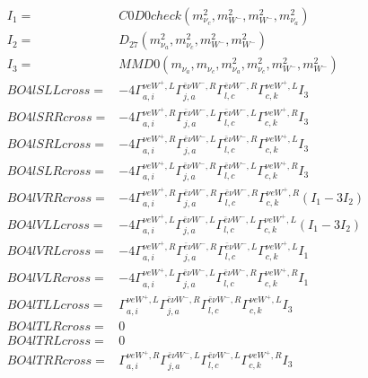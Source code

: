 \documentclass[A4,landscape]{article}
\begin{document}
\begin{align} 
I_1 = & C0D0check(m^2_{\nu_{{c}}}, m^2_{W^-}, m^2_{W^-}, m^2_{\nu_{{a}}}) \\ 
I_2 = & D_{27}(m^2_{\nu_{{a}}}, m^2_{\nu_{{c}}}, m^2_{W^-}, m^2_{W^-}) \\ 
I_3 = & MMD0(m_{\nu_{{a}}}, m_{\nu_{{c}}}, m^2_{\nu_{{a}}}, m^2_{\nu_{{c}}}, m^2_{W^-}, m^2_{W^-}) \\ 
  BO4lSLLcross= & -4  \Gamma^{\nu e W^+,L}_{a, i} \Gamma^{\bar{e}\nu W^- ,R}_{j, a} \Gamma^{\bar{e}\nu W^- ,R}_{l, c} \Gamma^{\nu e W^+,L}_{c, k} I_3 \\ 
  BO4lSRRcross= & -4  \Gamma^{\nu e W^+,R}_{a, i} \Gamma^{\bar{e}\nu W^- ,L}_{j, a} \Gamma^{\bar{e}\nu W^- ,L}_{l, c} \Gamma^{\nu e W^+,R}_{c, k} I_3 \\ 
  BO4lSRLcross= & -4  \Gamma^{\nu e W^+,R}_{a, i} \Gamma^{\bar{e}\nu W^- ,L}_{j, a} \Gamma^{\bar{e}\nu W^- ,R}_{l, c} \Gamma^{\nu e W^+,L}_{c, k} I_3 \\ 
  BO4lSLRcross= & -4  \Gamma^{\nu e W^+,L}_{a, i} \Gamma^{\bar{e}\nu W^- ,R}_{j, a} \Gamma^{\bar{e}\nu W^- ,L}_{l, c} \Gamma^{\nu e W^+,R}_{c, k} I_3 \\ 
  BO4lVRRcross= & -4  \Gamma^{\nu e W^+,R}_{a, i} \Gamma^{\bar{e}\nu W^- ,R}_{j, a} \Gamma^{\bar{e}\nu W^- ,R}_{l, c} \Gamma^{\nu e W^+,R}_{c, k} (I_1 - 3 I_2) \\ 
  BO4lVLLcross= & -4  \Gamma^{\nu e W^+,L}_{a, i} \Gamma^{\bar{e}\nu W^- ,L}_{j, a} \Gamma^{\bar{e}\nu W^- ,L}_{l, c} \Gamma^{\nu e W^+,L}_{c, k} (I_1 - 3 I_2) \\ 
  BO4lVRLcross= & -4  \Gamma^{\nu e W^+,R}_{a, i} \Gamma^{\bar{e}\nu W^- ,R}_{j, a} \Gamma^{\bar{e}\nu W^- ,L}_{l, c} \Gamma^{\nu e W^+,L}_{c, k} I_1 \\ 
  BO4lVLRcross= & -4  \Gamma^{\nu e W^+,L}_{a, i} \Gamma^{\bar{e}\nu W^- ,L}_{j, a} \Gamma^{\bar{e}\nu W^- ,R}_{l, c} \Gamma^{\nu e W^+,R}_{c, k} I_1 \\ 
  BO4lTLLcross= &  \Gamma^{\nu e W^+,L}_{a, i} \Gamma^{\bar{e}\nu W^- ,R}_{j, a} \Gamma^{\bar{e}\nu W^- ,R}_{l, c} \Gamma^{\nu e W^+,L}_{c, k} I_3 \\ 
  BO4lTLRcross= & 0 \\ 
  BO4lTRLcross= & 0 \\ 
  BO4lTRRcross= &  \Gamma^{\nu e W^+,R}_{a, i} \Gamma^{\bar{e}\nu W^- ,L}_{j, a} \Gamma^{\bar{e}\nu W^- ,L}_{l, c} \Gamma^{\nu e W^+,R}_{c, k} I_3 \\ 
\end{align} 
\end{document}

